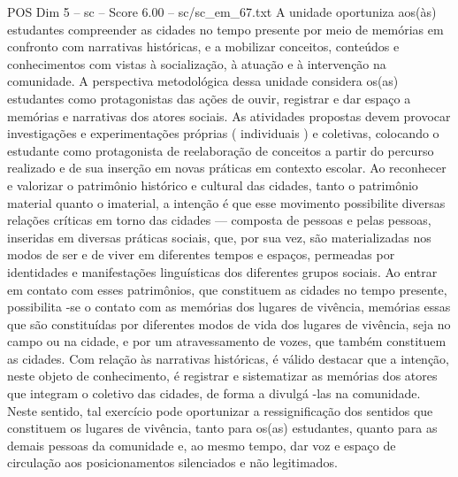 \begin{textsample}{POS Dim 5 – sc – Score 6.00 – sc/sc\_em\_67.txt}
A unidade oportuniza aos(às) estudantes compreender as cidades no tempo presente por meio de memórias em confronto com narrativas históricas, e a mobilizar conceitos, conteúdos e conhecimentos com vistas à socialização, à atuação e à intervenção na comunidade.
A perspectiva metodológica dessa unidade considera os(as) estudantes como protagonistas das ações de ouvir, registrar e dar espaço a memórias e narrativas dos atores sociais.
As atividades propostas devem provocar investigações e experimentações próprias ( individuais ) e coletivas, colocando o estudante como protagonista de reelaboração de conceitos a partir do percurso realizado e de sua inserção em novas práticas em contexto escolar.
Ao reconhecer e valorizar o patrimônio histórico e cultural das cidades, tanto o patrimônio material quanto o imaterial, a intenção é que esse movimento possibilite diversas relações críticas em torno das cidades — composta de pessoas e pelas pessoas, inseridas em diversas práticas sociais, que, por sua vez, são materializadas nos modos de ser e de viver em diferentes tempos e espaços, permeadas por identidades e manifestações linguísticas dos diferentes grupos sociais.
Ao entrar em contato com esses patrimônios, que constituem as cidades no tempo presente, possibilita -se o contato com as memórias dos lugares de vivência, memórias essas que são constituídas por diferentes modos de vida dos lugares de vivência, seja no campo ou na cidade, e por um atravessamento de vozes, que também constituem as cidades.
Com relação às narrativas históricas, é válido destacar que a intenção, neste objeto de conhecimento, é registrar e sistematizar as memórias dos atores que integram o coletivo das cidades, de forma a divulgá -las na comunidade.
Neste sentido, tal exercício pode oportunizar a ressignificação dos sentidos que constituem os lugares de vivência, tanto para os(as) estudantes, quanto para as demais pessoas da comunidade e, ao mesmo tempo, dar voz e espaço de circulação aos posicionamentos silenciados e não legitimados.

\end{textsample}
